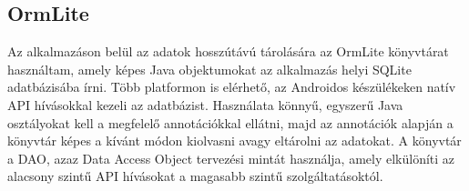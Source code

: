 \subsection{OrmLite}
\label{ormlite}

Az alkalmazáson belül az adatok hosszútávú tárolására az OrmLite könyvtárat \cite{ormlite} használtam, amely képes Java objektumokat az alkalmazás helyi SQLite adatbázisába írni. 
Több platformon is elérhető, az Androidos készülékeken natív API hívásokkal kezeli az adatbázist. 
Használata könnyű, egyszerű Java osztályokat kell a megfelelő annotációkkal ellátni, majd az annotációk alapján a könyvtár képes a kívánt módon kiolvasni avagy eltárolni az adatokat. 
A könyvtár a DAO, azaz Data Access Object tervezési mintát használja, amely elkülöníti az alacsony szintű API hívásokat a magasabb szintű szolgáltatásoktól. 
